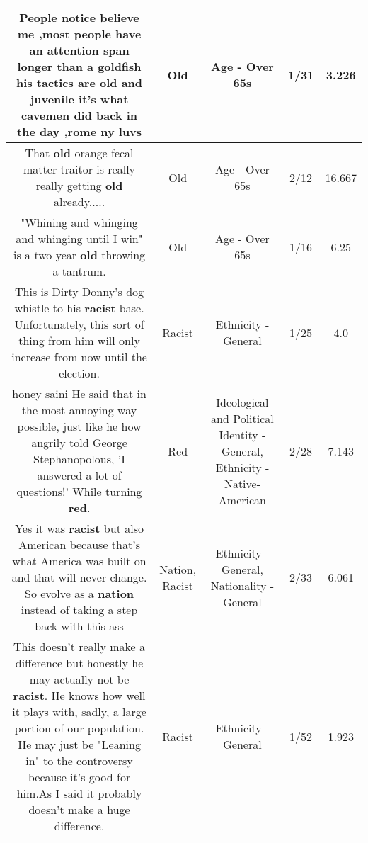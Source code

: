 \documentclass[11pt]{article}
\newlength\mylength
\begin{document}
\begin{center}
\begin{longtable}{|C{.65\mylength}|C{.30\mylength}|C{.12\mylength}|C{.12\mylength}|C{.12\mylength}|}
  \small People notice believe me ,most people have an attention span longer than a goldfish his tactics are \textbf{old} and juvenile it's what cavemen did back in the day ,rome ny luvs\normalsize   & Old & Age - Over 65s & 1/31 & 3.226 \\  \hline
  \small That \textbf{old} orange fecal matter traitor is really really getting \textbf{old} already.....\normalsize   & Old & Age - Over 65s & 2/12 & 16.667 \\  \hline
  \small "Whining and whinging and whinging until I win" is a two year \textbf{old} throwing a tantrum.\normalsize   & Old & Age - Over 65s & 1/16 & 6.25 \\  \hline
  \small This is Dirty Donny's dog whistle to his \textbf{racist} base. Unfortunately, this sort of thing from him will only increase from now until the election.\normalsize   & Racist & Ethnicity - General & 1/25 & 4.0 \\  \hline
  \small honey saini He said that in the most annoying way possible, just like he how angrily told George Stephanopolous, 'I answered a lot of questions!' While turning \textbf{r\textbf{ed}}.\normalsize   & Red &  Ideological and Political Identity - General, Ethnicity - Native-American & 2/28 & 7.143 \\  \hline
  \small Yes it was \textbf{racist} but also American because that's what America was built on and that will never change. So evolve as a \textbf{nation} instead of taking a step back with this ass\normalsize   & Nation, Racist & Ethnicity - General, Nationality - General & 2/33 & 6.061 \\  \hline
  \small This doesn't really make a difference but honestly he may actually not be \textbf{racist}. He knows how well it plays with, sadly, a large portion of our population. He may just be "Leaning in" to the controversy because it's good for him.As I said it probably doesn't make a huge difference.\normalsize   & Racist & Ethnicity - General & 1/52 & 1.923 \\  \hline

\end{longtable}
\end{center}
\end{document}
